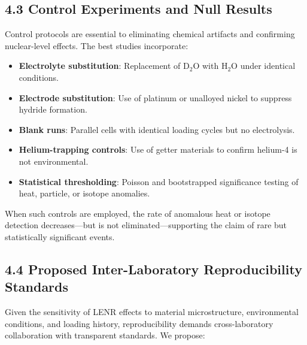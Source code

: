     \subsection{4.3 Control Experiments and Null Results}
    
    Control protocols are essential to eliminating chemical artifacts and confirming nuclear-level effects. The best studies incorporate:
    
    \begin{itemize}
        \item \textbf{Electrolyte substitution}: Replacement of D$_2$O with H$_2$O under identical conditions.
        \item \textbf{Electrode substitution}: Use of platinum or unalloyed nickel to suppress hydride formation.
        \item \textbf{Blank runs}: Parallel cells with identical loading cycles but no electrolysis.
        \item \textbf{Helium-trapping controls}: Use of getter materials to confirm helium-4 is not environmental.
        \item \textbf{Statistical thresholding}: Poisson and bootstrapped significance testing of heat, particle, or isotope anomalies.
    \end{itemize}
    
    When such controls are employed, the rate of anomalous heat or isotope detection decreases—but is not eliminated—supporting the claim of rare but statistically significant events.
    
    \subsection{4.4 Proposed Inter-Laboratory Reproducibility Standards}
    
    Given the sensitivity of LENR effects to material microstructure, environmental conditions, and loading history, reproducibility demands cross-laboratory collaboration with transparent standards. We propose:
    
